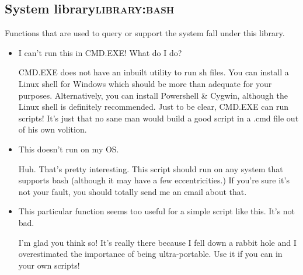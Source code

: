 \documentclass[11pt]{article}
\begin{document}
\subsection{System library\hfill{}\textsc{library:bash}}
\label{sec:orgada93e1}

Functions that are used to query or support the system fall under this library.

\begin{itemize}
\item I can't run this in CMD.EXE! What do I do?

CMD.EXE does not have an inbuilt utility to run sh files. You can install a Linux shell for Windows which should be more than adequate for your purposes. Alternatively, you can install Powershell \& Cygwin, although the Linux shell is definitely recommended. Just to be clear, CMD.EXE can run scripts! It's just that no sane man would build a good script in a .cmd file out of his own volition.

\item This doesn't run on my OS.

Huh. That's pretty interesting. This script should run on any system that supports bash (although it may have a few eccentricities.)
If you're sure it's not your fault, you should totally send me an email about that.

\item This particular function seems too useful for a simple script like this. It's not bad.

I'm glad you think so! It's really there because I fell down a rabbit hole and I overestimated the importance of being ultra-portable. 
Use it if you can in your own scripts!
\end{itemize}
\end{document}

